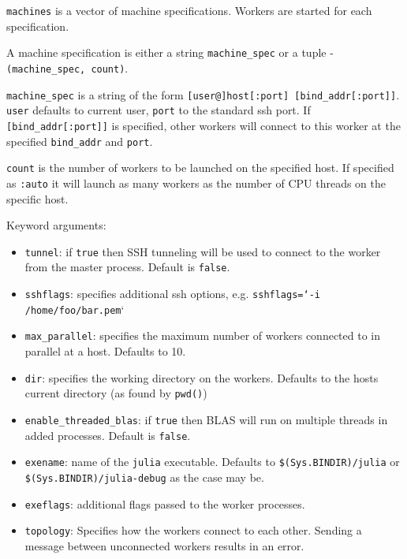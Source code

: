 \begin{adjustwidth}{2em}{0pt}
\texttt{machines} is a vector of machine specifications. Workers are started for each specification.

A machine specification is either a string \texttt{machine\_spec} or a tuple - \texttt{(machine\_spec, count)}.

\texttt{machine\_spec} is a string of the form \texttt{[user@]host[:port] [bind\_addr[:port]]}. \texttt{user} defaults to current user, \texttt{port} to the standard ssh port. If \texttt{[bind\_addr[:port]]} is specified, other workers will connect to this worker at the specified \texttt{bind\_addr} and \texttt{port}.

\texttt{count} is the number of workers to be launched on the specified host. If specified as \texttt{:auto} it will launch as many workers as the number of CPU threads on the specific host.

Keyword arguments:

\begin{itemize}
\item \texttt{tunnel}: if \texttt{true} then SSH tunneling will be used to connect to the worker from the master process. Default is \texttt{false}.


\item \texttt{sshflags}: specifies additional ssh options, e.g. \texttt{sshflags=`-i /home/foo/bar.pem}`


\item \texttt{max\_parallel}: specifies the maximum number of workers connected to in parallel at a host. Defaults to 10.


\item \texttt{dir}: specifies the working directory on the workers. Defaults to the host{\textquotesingle}s current directory (as found by \texttt{pwd()})


\item \texttt{enable\_threaded\_blas}: if \texttt{true} then  BLAS will run on multiple threads in added processes. Default is \texttt{false}.


\item \texttt{exename}: name of the \texttt{julia} executable. Defaults to \texttt{{\textquotedbl}\$(Sys.BINDIR)/julia{\textquotedbl}} or \texttt{{\textquotedbl}\$(Sys.BINDIR)/julia-debug{\textquotedbl}} as the case may be.


\item \texttt{exeflags}: additional flags passed to the worker processes.


\item \texttt{topology}: Specifies how the workers connect to each other. Sending a message between unconnected workers results in an error.


\end{itemize}
\end{adjustwidth}
